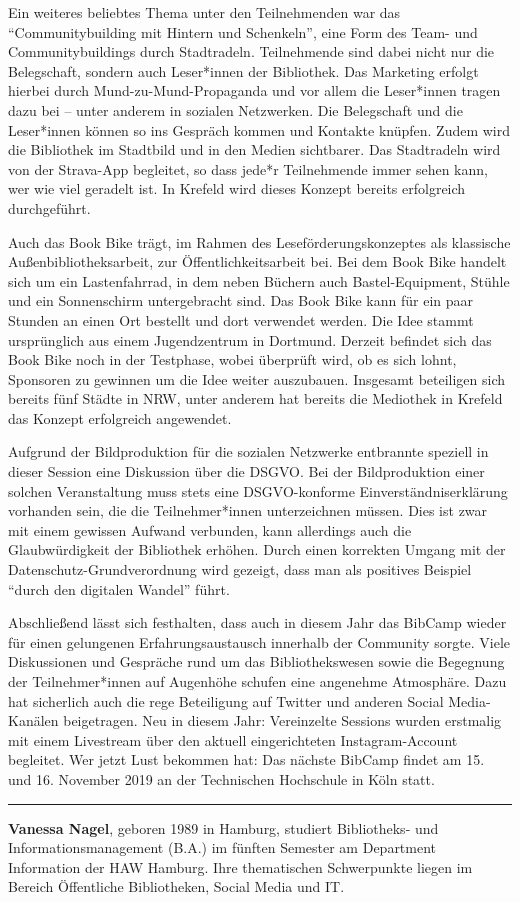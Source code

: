 \documentclass[a4paper,
fontsize=11pt,
oneside,
numbers=noperiodatend,
parskip=half-,
bibliography=totoc,
final
]{scrartcl}
\begin{document}
Ein weiteres beliebtes Thema unter den Teilnehmenden war das
\enquote{Communitybuilding mit Hintern und Schenkeln}, eine Form des
Team- und Communitybuildings durch Stadtradeln. Teilnehmende sind dabei
nicht nur die Belegschaft, sondern auch Leser*innen der Bibliothek. Das
Marketing erfolgt hierbei durch Mund-zu-Mund-Propaganda und vor allem
die Leser*innen tragen dazu bei -- unter anderem in sozialen Netzwerken.
Die Belegschaft und die Leser*innen können so ins Gespräch kommen und
Kontakte knüpfen. Zudem wird die Bibliothek im Stadtbild und in den
Medien sichtbarer. Das Stadtradeln wird von der Strava-App begleitet, so
dass jede*r Teilnehmende immer sehen kann, wer wie viel geradelt ist. In
Krefeld wird dieses Konzept bereits erfolgreich durchgeführt.

Auch das Book Bike trägt, im Rahmen des Leseförderungskonzeptes als
klassische Außenbibliotheksarbeit, zur Öffentlichkeitsarbeit bei. Bei
dem Book Bike handelt sich um ein Lastenfahrrad, in dem neben Büchern
auch Bastel-Equipment, Stühle und ein Sonnenschirm untergebracht sind.
Das Book Bike kann für ein paar Stunden an einen Ort bestellt und dort
verwendet werden. Die Idee stammt ursprünglich aus einem Jugendzentrum
in Dortmund. Derzeit befindet sich das Book Bike noch in der Testphase,
wobei überprüft wird, ob es sich lohnt, Sponsoren zu gewinnen um die
Idee weiter auszubauen. Insgesamt beteiligen sich bereits fünf Städte in
NRW, unter anderem hat bereits die Mediothek in Krefeld das Konzept
erfolgreich angewendet.

Aufgrund der Bildproduktion für die sozialen Netzwerke entbrannte
speziell in dieser Session eine Diskussion über die DSGVO. Bei der
Bildproduktion einer solchen Veranstaltung muss stets eine
DSGVO-konforme Einverständniserklärung vorhanden sein, die die
Teilnehmer*innen unterzeichnen müssen. Dies ist zwar mit einem gewissen
Aufwand verbunden, kann allerdings auch die Glaubwürdigkeit der
Bibliothek erhöhen. Durch einen korrekten Umgang mit der
Datenschutz-Grundverordnung wird gezeigt, dass man als positives
Beispiel \enquote{durch den digitalen Wandel} führt.

Abschließend lässt sich festhalten, dass auch in diesem Jahr das BibCamp
wieder für einen gelungenen Erfahrungsaustausch innerhalb der Community
sorgte. Viele Diskussionen und Gespräche rund um das Bibliothekswesen
sowie die Begegnung der Teilnehmer*innen auf Augenhöhe schufen eine
angenehme Atmosphäre. Dazu hat sicherlich auch die rege Beteiligung auf
Twitter und anderen Social Media-Kanälen beigetragen. Neu in diesem
Jahr: Vereinzelte Sessions wurden erstmalig mit einem Livestream über
den aktuell eingerichteten Instagram-Account begleitet. Wer jetzt Lust
bekommen hat: Das nächste BibCamp findet am 15. und 16. November 2019 an
der Technischen Hochschule in Köln statt.

\begin{center}\rule{0.5\linewidth}{\linethickness}\end{center}

\textbf{Vanessa Nagel}, geboren 1989 in Hamburg, studiert Bibliotheks-
und Informationsmanagement (B.A.) im fünften Semester am Department
Information der HAW Hamburg. Ihre thematischen Schwerpunkte liegen im
Bereich Öffentliche Bibliotheken, Social Media und IT.
\end{document}
